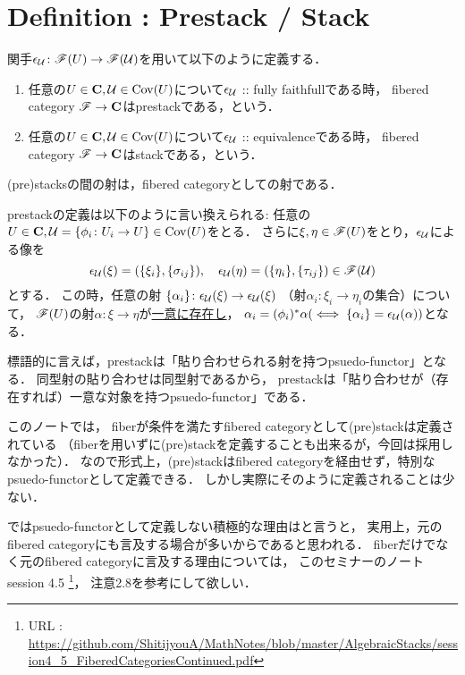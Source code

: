 \documentclass[a4paper]{jsarticle}
\begin{document}
\section{Definition : Prestack / Stack }
\begin{Def}
    関手$\epsilon_{\mathcal{U}} \colon \mathscr{F}(U) \to \mathscr{F}(\mathcal{U})$を用いて以下のように定義する．
    \begin{enumerate}[label=(\roman*)]
    \item
        任意の$U \in \mathbf{C}, \mathcal{U} \in \operatorname{Cov}(U)$について$\epsilon_{\mathcal{U}}$ :: fully faithfullである時，
        fibered category $\mathscr{F} \to \mathbf{C}$はprestackである，という．
    \item
        任意の$U \in \mathbf{C}, \mathcal{U} \in \operatorname{Cov}(U)$について$\epsilon_{\mathcal{U}}$ :: equivalenceである時，
        fibered category $\mathscr{F} \to \mathbf{C}$はstackである，という．
    \end{enumerate}

    (pre)stacksの間の射は，fibered categoryとしての射である．
\end{Def}

\begin{Remark}
    prestackの定義は以下のように言い換えられる:
    任意の$U \in \mathbf{C}, \mathcal{U}=\{\phi_i \colon U_i \to U\} \in \operatorname{Cov}(U)$をとる．
    さらに$\xi, \eta \in \mathscr{F}(U)$をとり，$\epsilon_{\mathcal{U}}$による像を
    \[
        \epsilon_{\mathcal{U}}(\xi)=(\{\xi_i\}, \{\sigma_{ij}\}),\quad
        \epsilon_{\mathcal{U}}(\eta)=(\{\eta_i\}, \{\tau_{ij}\})
            \in \mathscr{F}(\mathcal{U}) 
    \]とする．
    この時，任意の射
    $\{\alpha_i\} \colon \epsilon_{\mathcal{U}}(\xi) \to \epsilon_{\mathcal{U}}(\xi)$
    （射$\alpha_i \colon \xi_i \to \eta_i$の集合）について，
    $\mathscr{F}(U)$の射$\alpha \colon \xi \to \eta$が\underline{一意に存在し}，
    $\alpha_i=(\phi_i)^*\alpha (\iff \{\alpha_i\}=\epsilon_{\mathcal{U}}(\alpha))$となる．

    標語的に言えば，prestackは「貼り合わせられる射を持つpsuedo-functor」となる．
    同型射の貼り合わせは同型射であるから，
    prestackは「貼り合わせが（存在すれば）一意な対象を持つpsuedo-functor」である．
\end{Remark}

\begin{Remark}
    このノートでは，
    fiberが条件を満たすfibered categoryとして(pre)stackは定義されている
    （fiberを用いずに(pre)stackを定義することも出来るが，今回は採用しなかった）．
    なので形式上，(pre)stackはfibered categoryを経由せず，特別なpsuedo-functorとして定義できる．
    しかし実際にそのように定義されることは少ない．

    ではpsuedo-functorとして定義しない積極的な理由はと言うと，
    実用上，元のfibered categoryにも言及する場合が多いからであると思われる．
    fiberだけでなく元のfibered categoryに言及する理由については，
    このセミナーのノート session 4.5
    \footnote{URL : \url{https://github.com/ShitijyouA/MathNotes/blob/master/AlgebraicStacks/session4_5_FiberedCategoriesContinued.pdf}}，
    注意2.8を参考にして欲しい．
\end{Remark}
\end{document}
